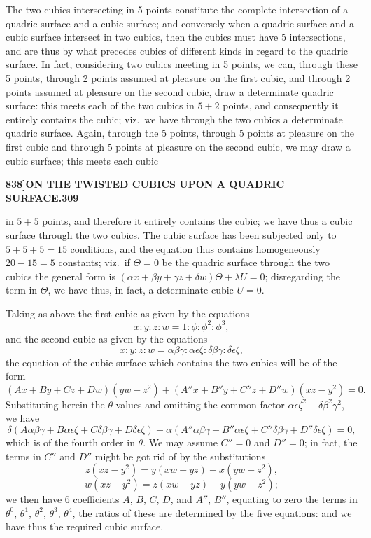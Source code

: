 \documentclass[11pt]{article}
\begin{document}
\medskip

The two cubics intersecting in 5 points constitute the complete intersection of a quadric surface and a cubic surface; and conversely when a quadric surface and a cubic surface intersect in two cubics, then the cubics must have 5 intersections, and are thus by what precedes cubics of different kinds in regard to the quadric surface. In fact, considering two cubics meeting in 5 points, we can, through these 5 points, through 2 points assumed at pleasure on the first cubic, and through 2 points assumed at pleasure on the second cubic, draw a determinate quadric surface: this meets each of the two cubics in $5 + 2$ points, and consequently it entirely contains the cubic; viz.\ we have through the two cubics a determinate quadric surface. Again, through the 5 points, through 5 points at pleasure on the first cubic and through 5 points at pleasure on the second cubic, we may draw a cubic surface; this meets each cubic

\newpage

\noindent\textbf{838]}\hfill\textbf{ON THE TWISTED CUBICS UPON A QUADRIC SURFACE.}\hfill\textbf{309}

\bigskip

\noindent in $5 + 5$ points, and therefore it entirely contains the cubic; we have thus a cubic surface through the two cubics. The cubic surface has been subjected only to $5 + 5 + 5 = 15$ conditions, and the equation thus contains homogeneously $20 - 15 = 5$ constants; viz.\ if $\Theta = 0$ be the quadric surface through the two cubics the general form is $(\alpha x + \beta y + \gamma z + \delta w)\Theta + \lambda U = 0$; disregarding the term in $\Theta$, we have thus, in fact, a determinate cubic $U = 0$.

\medskip

Taking as above the first cubic as given by the equations
\[
x : y : z : w = 1 : \phi : \phi^{2} : \phi^{3},
\]
and the second cubic as given by the equations
\[
x : y : z : w = \alpha\beta\gamma : \alpha\epsilon\zeta : \delta\beta\gamma : \delta\epsilon\zeta,
\]
the equation of the cubic surface which contains the two cubics will be of the form
\[
(Ax + By + Cz + Dw)(yw - z^{2}) + (A''x + B''y + C''z + D''w)(xz - y^{2}) = 0.
\]
Substituting herein the $\theta$-values and omitting the common factor $\alpha\epsilon\zeta^{2} - \delta\beta^{2}\gamma^{2}$, we have
\[
\delta(A\alpha\beta\gamma + B\alpha\epsilon\zeta + C\delta\beta\gamma + D\delta\epsilon\zeta) - \alpha(A''\alpha\beta\gamma + B''\alpha\epsilon\zeta + C''\delta\beta\gamma + D''\delta\epsilon\zeta) = 0,
\]
which is of the fourth order in $\theta$. We may assume $C'' = 0$ and $D'' = 0$; in fact, the terms in $C''$ and $D''$ might be got rid of by the substitutions
\[
z(xz - y^{2}) = y(xw - yz) - x(yw - z^{2}),
\]
\[
w(xz - y^{2}) = z(xw - yz) - y(yw - z^{2});
\]
we then have 6 coefficients $A$, $B$, $C$, $D$, and $A''$, $B''$, equating to zero the terms in $\theta^{0}$, $\theta^{1}$, $\theta^{2}$, $\theta^{3}$, $\theta^{4}$, the ratios of these are determined by the five equations: and we have thus the required cubic surface.
\end{document}
